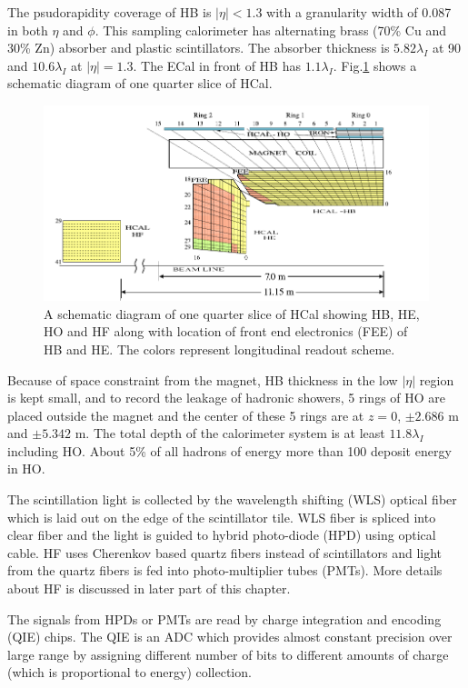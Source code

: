 The psudorapidity coverage of HB is $|\eta| < 1.3$ with a granularity width of 0.087 in both $\eta$ and $\phi$. This sampling calorimeter 
has alternating brass (70\% Cu and 30\% Zn) absorber and plastic scintillators. The absorber thickness is $5.82\lambda_I$ at 90\textdegree 
and $10.6\lambda_I$ at $|\eta| =1.3$. The ECal in front of HB has $1.1\lambda_I$. Fig.\ref{fig:Hcal_schematic} shows a schematic diagram 
of one quarter slice of HCal.
\begin{figure}[h!]
\centering
\includegraphics[width=0.9\linewidth]{../Figures/Chap2/Hcal_schematic}
\caption[Schematic diagram of HCal]{A schematic diagram of one quarter slice of HCal showing HB, HE, HO and HF along with location of 
front end electronics (FEE) of HB and HE. The colors represent longitudinal readout scheme.}
\label{fig:Hcal_schematic}
\end{figure}
Because of space constraint from the magnet, HB thickness in the low $|\eta|$ region is kept small, and to record the leakage of hadronic 
showers, 5 rings of HO are placed outside the magnet and the center of these 5 rings are at $z=0$, $\pm2.686$ m and $\pm5.342$ m. The total depth of the calorimeter system is at least $11.8\lambda_I$ including HO.
About 5\% of all hadrons of energy more than 100 \gev deposit energy in HO.

The scintillation light is collected by the wavelength shifting (WLS) optical fiber which is laid out on the edge of the scintillator 
tile. WLS fiber is spliced into clear fiber and the light is guided to hybrid photo-diode (HPD) using optical cable. HF uses Cherenkov 
based quartz fibers instead of scintillators and light from the quartz fibers is fed into photo-multiplier tubes (PMTs). More details 
about HF is discussed in later part of this chapter.

The signals from HPDs or PMTs are read by charge integration and encoding (QIE) chips. The QIE is an ADC which provides almost constant 
precision over large range by assigning different number of bits to different amounts of charge (which is proportional to energy) 
collection.

